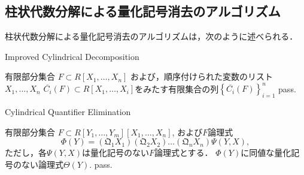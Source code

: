 \documentclass[uplatex, dvipdfmx]{jsarticle}
\numberwithin{equation}{section}
\newcommand{\Qua}{\mathfrak{Q}}
\theoremstyle{definition}
\begin{document}
\subsection{柱状代数分解による量化記号消去のアルゴリズム}

柱状代数分解による量化記号消去のアルゴリズムは，次のように述べられる．

\begin{algorithm}
     \caption{Improved Cylindrical Decomposition}
     \begin{algorithmic}[1]
          \REQUIRE 
               有限部分集合
               $F \subset R[X_1, \dots, X_n]$
               および，順序付けられた変数のリスト$X_1, \dots, X_n$
          \ENSURE
               $\overline{C_i}(F) \subset R[X_1, \dots, X_i]$をみたす有限集合の列$\left\{\overline{C_i}(F)\right\}_{i=1}^n$
          \STATE pass.
     \end{algorithmic}
\end{algorithm}

\begin{algorithm}
     \caption{Cylindrical Quantifier Elimination}
     \begin{algorithmic}[1]
          \REQUIRE 
               有限部分集合
               $F \subset R[Y_1, \dots, Y_m][X_1, \dots, X_n]$,
               および$F$論理式
               \[\Phi(Y) = (\Qua_1 X_1)(\Qua_2 X_2)\dots(\Qua_n X_n) \Psi(Y,X),\]
               ただし，各$\Psi(Y,X)$は量化記号のない$F$論理式とする．
          \ENSURE 
               $\Phi(Y)$に同値な量化記号のない論理式$\Theta(Y)$.
          \STATE pass.
     \end{algorithmic}
\end{algorithm}





\end{document}

